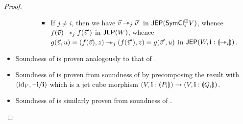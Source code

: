 \documentclass[a4paper]{memoir}
\begin{document}
\begin{proof}
\begin{itemize}
\begin{itemize}
\begin{itemize}
\begin{itemize}
					\item If $j \neq i$, then we have $\vec v \rightarrowtriangle_j \vec v'$ in $\mathsf{JEP}(\mathsf{SymCl}^\boxdot_i V)$, whence $f(\vec v) \rightarrowtriangle_j f(\vec v')$ in $\mathsf{JEP}(W)$, whence $g(\vec v, u) = (f(\vec v), z) \rightarrowtriangle_j (f(\vec v'), z) = g(\vec v', u)$ in $\mathsf{JEP}(W, \mathbf{i} : {\llparenthesis \rightarrowtriangle_i \rrparenthesis})$.
				\end{itemize}
			\end{itemize}
		\end{itemize}
		
		\item Soundness of  is proven analogously to that of .
		
		\item Soundness of  is proven from soundness of \allowbreak {} by precomposing the result with $(\mathrm{id}_V, \lnot \mathbf{i} / \mathbf{i})$ which is a jet cube morphism $(V, \mathbf{i} : {\llparenthesis P_i \rrparenthesis}) \to (V, \mathbf{i} : {\llparenthesis Q_i \rrparenthesis})$.
		
		\item Soundness of  is similarly proven from soundness of .
		

\end{itemize}
\end{proof}
\end{document}
